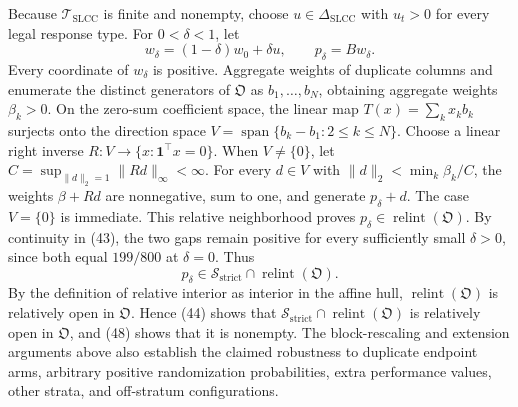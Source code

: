 Because \(\mathcal T_{\mathrm{SLCC}}\) is finite and nonempty, choose \(u\in\Delta_{\mathrm{SLCC}}\) with \(u_t>0\) for every legal response type.  For \(0<\delta<1\), let
\[
w_\delta=(1-\delta)w_0+\delta u,
\qquad
p_\delta=Bw_\delta.
\tag{47}
\]
Every coordinate of \(w_\delta\) is positive.  Aggregate weights of duplicate columns and enumerate the distinct generators of \(\mathfrak O\) as \(b_1,\ldots,b_N\), obtaining aggregate weights \(\beta_k>0\).  On the zero-sum coefficient space, the linear map \(T(x)=\sum_kx_kb_k\) surjects onto the direction space \(V=\operatorname{span}\{b_k-b_1:2\leq k\leq N\}\).  Choose a linear right inverse \(R:V\to\{x:\mathbf 1^{\top}x=0\}\).  When \(V\neq\{0\}\), let \(C=\sup_{\|d\|_2=1}\|Rd\|_\infty<\infty\).  For every \(d\in V\) with \(\|d\|_2<\min_k\beta_k/C\), the weights \(\beta+Rd\) are nonnegative, sum to one, and generate \(p_\delta+d\).  The case \(V=\{0\}\) is immediate.  This relative neighborhood proves \(p_\delta\in\operatorname{relint}(\mathfrak O)\).  By continuity in (43), the two gaps remain positive for every sufficiently small \(\delta>0\), since both equal \(199/800\) at \(\delta=0\).  Thus
\[
p_\delta\in\mathcal S_{\mathrm{strict}}\cap\operatorname{relint}(\mathfrak O).
\tag{48}
\]
By the definition of relative interior as interior in the affine hull, \(\operatorname{relint}(\mathfrak O)\) is relatively open in \(\mathfrak O\).  Hence (44) shows that \(\mathcal S_{\mathrm{strict}}\cap\operatorname{relint}(\mathfrak O)\) is relatively open in \(\mathfrak O\), and (48) shows that it is nonempty.  The block-rescaling and extension arguments above also establish the claimed robustness to duplicate endpoint arms, arbitrary positive randomization probabilities, extra performance values, other strata, and off-stratum configurations.